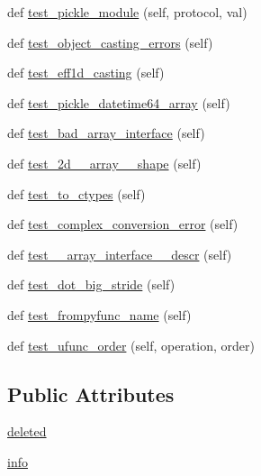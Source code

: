 \begin{DoxyCompactItemize}
\item 
def \hyperlink{classnumpy_1_1core_1_1tests_1_1test__regression_1_1TestRegression_a69ffc77a777828d995dde6ee2dea4156}{test\+\_\+pickle\+\_\+module} (self, protocol, val)
\item 
def \hyperlink{classnumpy_1_1core_1_1tests_1_1test__regression_1_1TestRegression_abde814464b9508d881109bb2c23d6f62}{test\+\_\+object\+\_\+casting\+\_\+errors} (self)
\item 
def \hyperlink{classnumpy_1_1core_1_1tests_1_1test__regression_1_1TestRegression_a01ad13d9763108e3e17d126b68f9c43c}{test\+\_\+eff1d\+\_\+casting} (self)
\item 
def \hyperlink{classnumpy_1_1core_1_1tests_1_1test__regression_1_1TestRegression_a5fc236f71b59462d16ecafad96839e5f}{test\+\_\+pickle\+\_\+datetime64\+\_\+array} (self)
\item 
def \hyperlink{classnumpy_1_1core_1_1tests_1_1test__regression_1_1TestRegression_aab624b978cd801a87e7a9ecd056b83e4}{test\+\_\+bad\+\_\+array\+\_\+interface} (self)
\item 
def \hyperlink{classnumpy_1_1core_1_1tests_1_1test__regression_1_1TestRegression_aa49b49af3017a6d969da6135db05af92}{test\+\_\+2d\+\_\+\+\_\+array\+\_\+\+\_\+shape} (self)
\item 
def \hyperlink{classnumpy_1_1core_1_1tests_1_1test__regression_1_1TestRegression_aef366dd444d0782f038bd5fcdc069e28}{test\+\_\+to\+\_\+ctypes} (self)
\item 
def \hyperlink{classnumpy_1_1core_1_1tests_1_1test__regression_1_1TestRegression_ad3be06c02ee92244c8d4052568d0b4ff}{test\+\_\+complex\+\_\+conversion\+\_\+error} (self)
\item 
def \hyperlink{classnumpy_1_1core_1_1tests_1_1test__regression_1_1TestRegression_ae1cd0fd1c3b034518224a97b3085112a}{test\+\_\+\+\_\+array\+\_\+interface\+\_\+\+\_\+descr} (self)
\item 
def \hyperlink{classnumpy_1_1core_1_1tests_1_1test__regression_1_1TestRegression_adaae035401446f33f84478a1897c751d}{test\+\_\+dot\+\_\+big\+\_\+stride} (self)
\item 
def \hyperlink{classnumpy_1_1core_1_1tests_1_1test__regression_1_1TestRegression_a6c46d9ccdb529f2d57235d6b15616d32}{test\+\_\+frompyfunc\+\_\+name} (self)
\item 
def \hyperlink{classnumpy_1_1core_1_1tests_1_1test__regression_1_1TestRegression_aace2d6243c42bb93dd35d07fb0128064}{test\+\_\+ufunc\+\_\+order} (self, operation, order)
\end{DoxyCompactItemize}
\subsection*{Public Attributes}
\begin{DoxyCompactItemize}
\item 
\hyperlink{classnumpy_1_1core_1_1tests_1_1test__regression_1_1TestRegression_a3654c1a632c8c422adb9592c666dfbfd}{deleted}
\item 
\hyperlink{classnumpy_1_1core_1_1tests_1_1test__regression_1_1TestRegression_a89ddde18fddfd597952698b18f0858b2}{info}
\end{DoxyCompactItemize}
